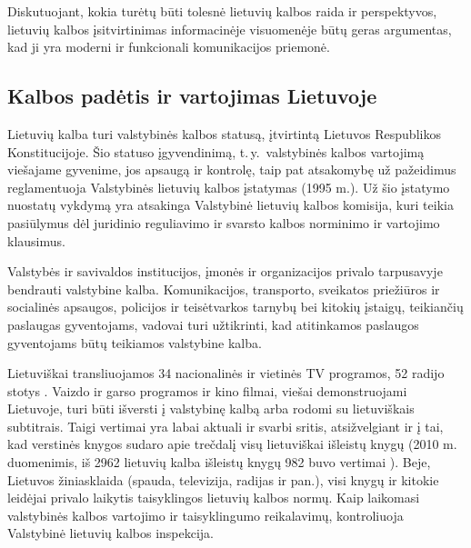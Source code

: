 \begin{multicols}{2}
Diskutuojant, kokia turėtų būti tolesnė lietuvių kalbos raida ir perspektyvos, lietuvių kalbos įsitvirtinimas informacinėje visuomenėje būtų geras argumentas, kad ji yra moderni ir funkcionali komunikacijos priemonė.

\subsection{Kalbos padėtis ir vartojimas Lietuvoje}

Lietuvių kalba turi valstybinės kalbos statusą, įtvirtintą Lietuvos Respublikos Konstitucijoje. Šio statuso įgyvendinimą, t.\,y.~valstybinės kalbos vartojimą viešajame gyvenime, jos apsaugą ir kontrolę, taip pat atsakomybę už pažeidimus reglamentuoja Valstybinės lietuvių kalbos įstatymas (1995 m.). Už šio įstatymo nuostatų vykdymą yra atsakinga Valstybinė lietuvių kalbos komisija, kuri teikia pasiūlymus dėl juridinio reguliavimo ir svarsto kalbos norminimo ir vartojimo klausimus.  


 Valstybės ir savivaldos institucijos, įmonės ir organizacijos privalo tarpusavyje bendrauti valstybine kalba. Komunikacijos, transporto, sveikatos priežiūros ir socialinės apsaugos, policijos ir teisėtvarkos tarnybų bei kitokių įstaigų, teikiančių paslaugas gyventojams, vadovai turi užtikrinti, kad atitinkamos paslaugos gyventojams būtų teikiamos valstybine kalba.   

    Lietuviškai transliuojamos 34 nacionalinės ir vietinės TV programos, 52 radijo stotys \cite{ldrt}.  Vaizdo ir garso programos ir kino filmai, viešai demonstruojami Lietuvoje, turi būti išversti į valstybinę kalbą arba rodomi su lietuviškais subtitrais. Taigi vertimai yra labai aktuali ir svarbi sritis, atsižvelgiant ir į tai, kad verstinės knygos sudaro apie trečdalį visų lietuviškai išleistų knygų (2010 m. duomenimis, iš 2962 lietuvių kalba išleistų knygų 982 buvo vertimai \cite{bbsc}).  Beje, Lietuvos žiniasklaida (spauda, televizija, radijas ir pan.), visi knygų ir kitokie leidėjai privalo laikytis taisyklingos lietuvių kalbos normų. Kaip laikomasi valstybinės kalbos vartojimo ir taisyklingumo reikalavimų, kontroliuoja Valstybinė lietuvių kalbos inspekcija.   


\end{multicols}

